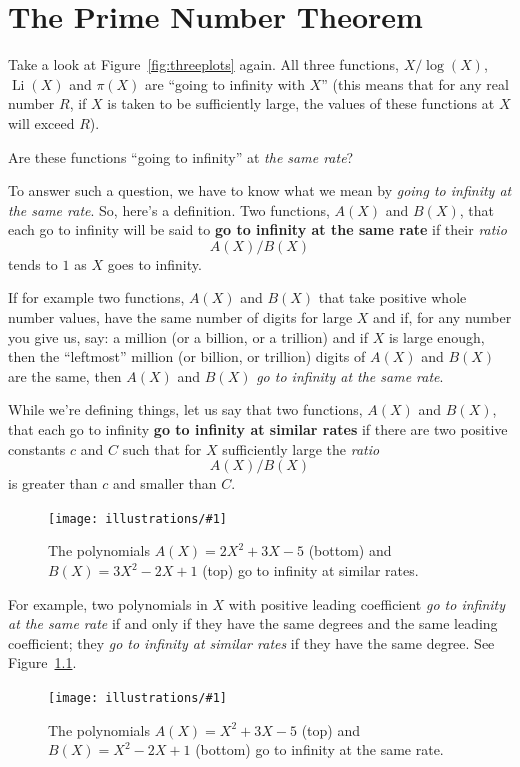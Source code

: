 \documentclass[openany]{book}
\DeclareMathOperator{\Li}{Li}
\newcommand{\ill}[3]{%
   \begin{figure}[H]%
   \vspace{-2ex}
   \centering%
   \texttt{[image: illustrations/\#1]}%
   \caption{#3}%
   \vspace{-2ex}
    \end{figure}}
\theoremstyle{plain}
\theoremstyle{definition}
\begin{document}
\chapter{The Prime Number Theorem\label{sec:pnt}}

Take a look at Figure~\ref{fig:threeplots} again.  All three functions, $X/\log(X)$,
$\Li(X)$ and $\pi(X)$ are ``going to infinity with $X$'' (this means
that for any real number $R$, if $X$ is taken to be sufficiently
large, the values of these functions at $X$ will exceed $R$).

Are these functions ``going to infinity'' at {\it the same rate}?

To answer such a question, we have to know what we mean by {\it going
  to infinity at the same rate}. So, here's a definition. Two
functions, $A(X)$ and $B(X)$, that each go to infinity will be said to
{\bf go to infinity at the same rate} if their {\it ratio}
$$A(X)/B(X)$$
tends to $1$ as $X$ goes to infinity.

If for example  two functions, $A(X)$ and $B(X)$ that take positive whole number values, have the same number of digits for large $X$  and if,  for any
number you give us, say: a million (or a billion, or a trillion) and if $X$ is large enough, then the
``leftmost'' million (or billion, or trillion) digits of $A(X)$ and $B(X)$ are the same,  then  $A(X)$ and $B(X)$  {\it go to infinity at the same rate}.


While we're defining things, let us say that two functions, $A(X)$
and $B(X)$, that each go to infinity {\bf go to infinity at
similar rates} if there are two positive constants $c$ and $C$
such that for $X$ sufficiently large the {\it ratio}
$$
      A(X)/B(X)
$$
is greater than $c$ and smaller than $C$.

    \ill{similar_rates}{1.0}{The polynomials $A(X)=2 X^{2} + 3 X - 5$ (bottom)
and $B(X)=  3 X^{2} - 2 X + 1$ (top) go to infinity at similar rates.\label{fig:simrates}}



For example, two polynomials in $X$ with positive leading coefficient
{\it go to infinity at the same rate} if and only if they have the
same degrees and the same leading coefficient; they {\it go to
  infinity at similar rates} if they have the same degree.
See Figure~\ref{fig:simrates}. %

 \ill{same_rates}{1.0}{The polynomials $A(X)=X^{2} + 3 X - 5$ (top)
and $B(X)= X^{2} - 2 X + 1$ (bottom) go to infinity
at the same rate.\label{fig:samerate}}
\end{document}

